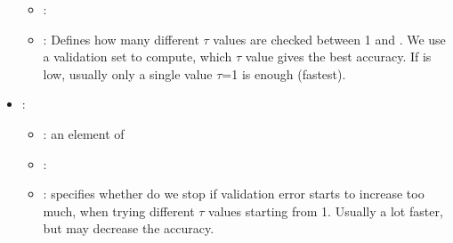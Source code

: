 \begin{itemize}
\begin{itemize}
                \item \optionDefaultValue{}: 
                \item \optionDescrption{}: Defines how many different $\tau$ values are checked between 1 and . We use a validation set to compute, which $\tau$ value gives the best accuracy. If  is low, usually only a single value $\tau$=1 is enough (fastest).
           \end{itemize}
    \item {}:
           \begin{itemize}
                \item \optionPossibleValues{}: an element of 
                \item \optionDefaultValue{}: 
                \item \optionDescrption{}: specifies whether do we stop if validation error starts to increase too much, when trying different $\tau$ values starting from 1.
                Usually a lot faster, but may decrease the accuracy.
           \end{itemize}
\end{itemize}
